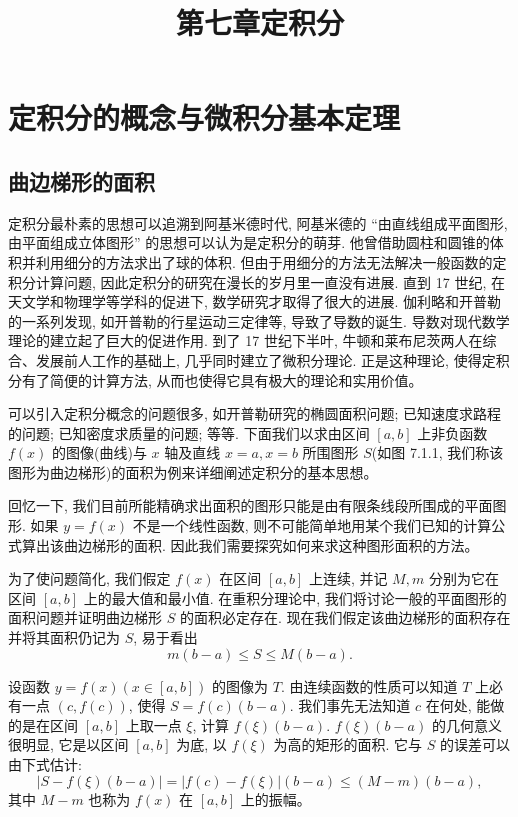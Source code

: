 \documentclass[UTF8,12pt,a4paper,fontset=fandol]{ctexart}
\title{第七章\quad 定积分}
\author{}
\date{}
\begin{document}
\maketitle

\section{定积分的概念与微积分基本定理}

\subsection{曲边梯形的面积}

定积分最朴素的思想可以追溯到阿基米德时代, 阿基米德的 ``由直线组成平面图形, 由平面组成立体图形'' 的思想可以认为是定积分的萌芽. 他曾借助圆柱和圆锥的体积并利用细分的方法求出了球的体积. 但由于用细分的方法无法解决一般函数的定积分计算问题, 因此定积分的研究在漫长的岁月里一直没有进展. 直到 17 世纪, 在天文学和物理学等学科的促进下, 数学研究才取得了很大的进展. 伽利略和开普勒的一系列发现, 如开普勒的行星运动三定律等, 导致了导数的诞生. 导数对现代数学理论的建立起了巨大的促进作用. 到了 17 世纪下半叶, 牛顿和莱布尼茨两人在综合、发展前人工作的基础上, 几乎同时建立了微积分理论. 正是这种理论, 使得定积分有了简便的计算方法, 从而也使得它具有极大的理论和实用价值。

可以引入定积分概念的问题很多, 如开普勒研究的椭圆面积问题; 已知速度求路程的问题; 已知密度求质量的问题; 等等. 下面我们以求由区间 $[a,b]$ 上非负函数 $f(x)$ 的图像(曲线)与 $x$ 轴及直线 $x=a,x=b$ 所围图形 $S$(如图 7.1.1, 我们称该图形为曲边梯形)的面积为例来详细阐述定积分的基本思想。

回忆一下, 我们目前所能精确求出面积的图形只能是由有限条线段所围成的平面图形. 如果 $y=f(x)$ 不是一个线性函数, 则不可能简单地用某个我们已知的计算公式算出该曲边梯形的面积. 因此我们需要探究如何来求这种图形面积的方法。

为了使问题简化, 我们假定 $f(x)$ 在区间 $[a,b]$ 上连续, 并记 $M,m$ 分别为它在区间 $[a,b]$ 上的最大值和最小值. 在重积分理论中, 我们将讨论一般的平面图形的面积问题并证明曲边梯形 $S$ 的面积必定存在. 现在我们假定该曲边梯形的面积存在并将其面积仍记为 $S$, 易于看出
\[
  m(b-a)\leq S\leq M(b-a).
\]

设函数 $y=f(x)(x\in[a,b])$ 的图像为 $T$. 由连续函数的性质可以知道 $T$ 上必有一点 $(c,f(c))$, 使得 $S=f(c)(b-a)$. 我们事先无法知道 $c$ 在何处, 能做的是在区间 $[a,b]$ 上取一点 $\xi$, 计算 $f(\xi)(b-a)$. $f(\xi)(b-a)$ 的几何意义很明显, 它是以区间 $[a,b]$ 为底, 以 $f(\xi)$ 为高的矩形的面积. 它与 $S$ 的误差可以由下式估计:
\[
  |S-f(\xi)(b-a)|=|f(c)-f(\xi)|(b-a)\leq (M-m)(b-a),
\]
其中 $M-m$ 也称为 $f(x)$ 在 $[a,b]$ 上的振幅。
\end{document}
